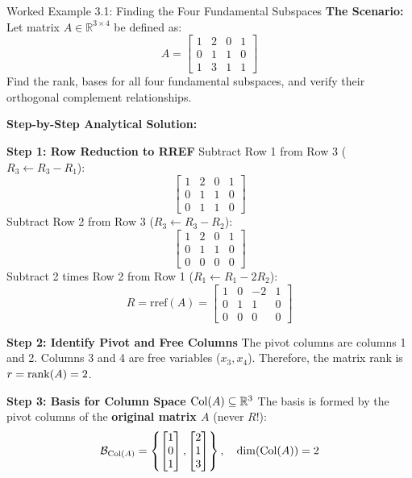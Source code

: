 \begin{examplebox}{Worked Example 3.1: Finding the Four Fundamental Subspaces}
\label{ex:w03_four_subspaces}
\textbf{The Scenario:}
Let matrix $A \in \mathbb{R}^{3 \times 4}$ be defined as:
\begin{equation}
A = \begin{bmatrix} 1 & 2 & 0 & 1 \\ 0 & 1 & 1 & 0 \\ 1 & 3 & 1 & 1 \end{bmatrix}
\end{equation}
Find the rank, bases for all four fundamental subspaces, and verify their orthogonal complement relationships.

\tcblower
\textbf{Step-by-Step Analytical Solution:}

\textbf{Step 1: Row Reduction to RREF}
Subtract Row 1 from Row 3 ($R_3 \leftarrow R_3 - R_1$):
\begin{equation*}
\begin{bmatrix} 1 & 2 & 0 & 1 \\ 0 & 1 & 1 & 0 \\ 0 & 1 & 1 & 0 \end{bmatrix}
\end{equation*}
Subtract Row 2 from Row 3 ($R_3 \leftarrow R_3 - R_2$):
\begin{equation*}
\begin{bmatrix} 1 & 2 & 0 & 1 \\ 0 & 1 & 1 & 0 \\ 0 & 0 & 0 & 0 \end{bmatrix}
\end{equation*}
Subtract 2 times Row 2 from Row 1 ($R_1 \leftarrow R_1 - 2R_2$):
\begin{equation*}
R = \text{rref}(A) = \begin{bmatrix} 1 & 0 & -2 & 1 \\ 0 & 1 & 1 & 0 \\ 0 & 0 & 0 & 0 \end{bmatrix}
\end{equation*}

\textbf{Step 2: Identify Pivot and Free Columns}
The pivot columns are columns 1 and 2. Columns 3 and 4 are free variables ($x_3, x_4$).
Therefore, the matrix rank is $r = \operatorname{rank}(A) = 2$.

\textbf{Step 3: Basis for Column Space $\operatorname{Col}(A) \subseteq \mathbb{R}^3$}
The basis is formed by the pivot columns of the \textbf{original matrix $A$} (never $R$!):
\begin{equation*}
\mathcal{B}_{\operatorname{Col}(A)} = \left\{ \begin{bmatrix} 1 \\ 0 \\ 1 \end{bmatrix}, \begin{bmatrix} 2 \\ 1 \\ 3 \end{bmatrix} \right\}, \quad \dim(\operatorname{Col}(A)) = 2
\end{equation*}


\end{examplebox}
